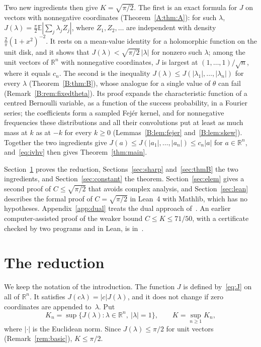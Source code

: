 \documentclass[11pt]{amsart}
\theoremstyle{remark}
\numberwithin{equation}{section}
\newcommand{\R}{\mathbb{R}}
\newcommand{\E}{\mathbb{E}}
\newcommand{\CUB}{71/50}
\begin{document}
Two new ingredients then give $K=\sqrt{\pi/2}$. The first is an exact formula for $J$ on vectors with nonnegative coordinates (Theorem~\ref{A:thm:A}): for such $\lambda$, $J(\lambda)=\frac\pi2\E|\sum_j\lambda_jZ_j|$, where $Z_1,Z_2,\dots$ are independent with density $\frac2\pi(1+x^2)^{-2}$. It rests on a mean-value identity for a holomorphic function on the unit disk, and it shows that $J(\lambda)<\sqrt{\pi/2}\,|\lambda|$ for nonzero such $\lambda$; among the unit vectors of $\R^n$ with nonnegative coordinates, $J$ is largest at $(1,\dots,1)/\sqrt n$, where it equals $c_n$. The second is the inequality $J(\lambda)\le J(|\lambda_1|,\dots,|\lambda_n|)$ for every $\lambda$ (Theorem~\ref{B:thm:B}), whose analogue for a single value of $\theta$ can fail (Remark~\ref{B:rem:fixedtheta}). Its proof expands the characteristic function of a centred Bernoulli variable, as a function of the success probability, in a Fourier series; the coefficients form a sampled Fej\'er kernel, and for nonnegative frequencies these distributions and all their convolutions put at least as much mass at $k$ as at $-k$ for every $k\ge0$ (Lemmas~\ref{B:lem:fejer} and~\ref{B:lem:skew}). Together the two ingredients give $J(a)\le J(|a_1|,\dots,|a_n|)\le c_n|a|$ for $a\in\R^n$, and~\eqref{eq:ivhv} then gives Theorem~\ref{thm:main}.

Section~\ref{sec:reduction} proves the reduction, Sections~\ref{sec:sharp} and~\ref{sec:thmB} the two ingredients, and Section~\ref{sec:constant} the theorem. Section~\ref{sec:elem} gives a second proof of $C\le\sqrt{\pi/2}$ that avoids complex analysis, and Section~\ref{sec:lean} describes the formal proof of $C=\sqrt{\pi/2}$ in Lean~4 with Mathlib, which has no hypotheses. Appendix~\ref{app:dual} treats the dual approach of~\cite{ILvHV}. An earlier computer-assisted proof of the weaker bound $C\le K\le\CUB$, with a certificate checked by two programs and in Lean, is in~\cite{Tom26}.

\section{The reduction}\label{sec:reduction}

We keep the notation of the introduction. The function $J$ is defined by~\eqref{eq:J} on all of $\R^n$. It satisfies $J(c\lambda)=|c|J(\lambda)$, and it does not change if zero coordinates are appended to~$\lambda$. Put
\[
K_n=\sup\{J(\lambda):\lambda\in\R^n,\ |\lambda|=1\},\qquad K=\sup_{n\ge1}K_n,
\]
where $|\cdot|$ is the Euclidean norm. Since $J(\lambda)\le\pi/2$ for unit vectors (Remark~\ref{rem:basic}), $K\le\pi/2$.
\end{document}
